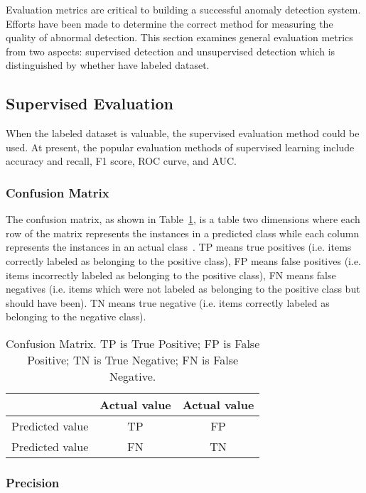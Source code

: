 Evaluation metrics are critical to building a 
successful anomaly detection system. 
Efforts have been made to determine the 
correct method for measuring the quality of abnormal detection. 
This section examines general evaluation metrics from two aspects: 
supervised detection
and unsupervised detection which is
distinguished by whether have labeled dataset.

\subsection{Supervised Evaluation}
When the labeled dataset is valuable,
the supervised evaluation method could be used.
At present,
the popular evaluation methods of supervised learning
include accuracy and recall,
F1 score,
ROC curve,
and AUC.

\subsubsection{Confusion Matrix}
The confusion matrix,
as shown in Table~\ref{tb:confusion},
is a table two dimensions
where each row of the matrix represents the instances
in a predicted class while
each column represents the instances
in an actual class~\cite{powers2011evaluation}.
TP means true positives
(i.e. items correctly labeled as belonging to the positive
class),
FP means false positives
(i.e. items incorrectly labeled as belonging to the
positive class),
FN means false negatives
(i.e. items which were not labeled as
belonging to the positive class but should have been).
TN means true negative
(i.e. items correctly labeled as belonging to the negative
class).

\begin{table}  \centering
  \caption{Confusion Matrix.
  TP is True Positive;
  FP is False Positive;
  TN is True Negative;
  FN is False Negative. }
  \label{tb:confusion}
  \begin{tabular}{ccc}
  \toprule
    & Actual value   &  Actual value    \\
  \midrule
  Predicted value  & TP & FP  \\
  Predicted value    & FN & TN  \\
  \bottomrule
  \end{tabular}
\end{table}


\subsubsection{Precision}

